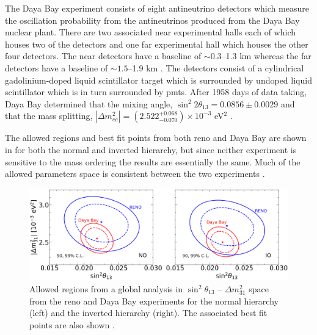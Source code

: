 The Daya Bay experiment consists of eight antineutrino detectors which measure the oscillation probability from the antineutrinos produced from the Daya Bay nuclear plant. There are two associated near experimental halls each of which houses two of the detectors and one far experimental hall which houses the other four detectors. The near detectors have a baseline of $\sim0.3$--1.3 km whereas the far detectors have a baseline of $\sim1.5$--1.9 km \cite{2020_global_reassessment_of_the_neutrino_oscillation_picture}. The detectors consist of a cylindrical gadolinium-doped liquid scintillator target which is surrounded by undoped liquid scintillator which is in turn surrounded by \glspl{pmt}. After 1958 days of data taking, Daya Bay determined that the mixing angle, $\sin^2{2\theta_{13}} = 0.0856 \pm 0.0029$ and that the mass splitting, $|\Delta m^2_{ee}| = (2.522^{+0.068}_{-0.070}) \times 10^{-3}$ eV$^2$ \cite{Measurement_of_electron_antineutrino_oscillation_with_1958_days_of_operation_at_Daya_Bay}.

The allowed regions and best fit points from both \gls{reno} and Daya Bay are shown in  for both the normal and inverted hierarchy, but since neither experiment is sensitive to the mass ordering the results are essentially the same. Much of the allowed parameters space is consistent between the two experiments \cite{2020_global_reassessment_of_the_neutrino_oscillation_picture}.

\begin{figure}
    \centering
    \includegraphics[width = \hugefigwidth]{figures-chap2/theta_13.png}
    \caption[Allowed regions in $\sin^2{\theta_{13}}$ -- $\Delta m^2_{31}$ space from the \gls{reno} and Daya Bay experiments.]{Allowed regions from a global analysis in $\sin^2{\theta_{13}}$ -- $\Delta m^2_{31}$ space from the \gls{reno} and Daya Bay experiments for the normal hierarchy (left) and the inverted hierarchy (right). The associated best fit points are also shown
    \cite{2020_global_reassessment_of_the_neutrino_oscillation_picture}.}
    \label{fig:Reno_Daya_Bay}
\end{figure}

